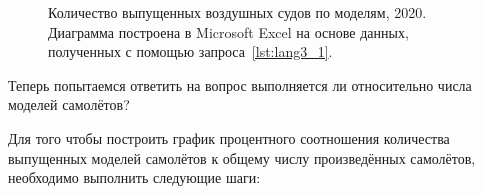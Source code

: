\begin{figure*}[h]

    \setlength{\fboxsep}{0pt}%
    \setlength{\fboxrule}{1pt}%

	\caption[Количество выпущенных воздушных судов по моделям, 2020.]{Количество выпущенных воздушных судов по моделям, 2020. Диаграмма построена в Microsoft Excel на основе данных, полученных с помощью запроса~\protect\ref{lst:lang3_1}.}%
    \label{fig:Number_of_aircraft_produced_ru_2020}%
\end{figure*}


\newpage 
{}
Теперь попытаемся ответить на вопрос выполняется ли  относительно числа моделей самолётов?

Для того чтобы построить график процентного соотношения количества выпущенных моделей самолётов к общему числу произведённых самолётов, необходимо выполнить следующие шаги:


